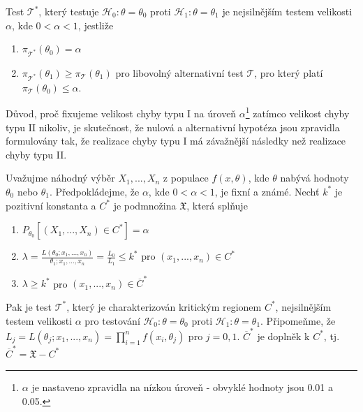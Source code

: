 \begin{definition}
Test $\mathscr{T}^*$, který testuje $\mathscr{H}_0: \theta = \theta_0$ proti $\mathscr{H}_1: \theta = \theta_1$ je nejsilnějším testem velikosti $\alpha$, kde $0 < \alpha < 1$, jestliže
\begin{enumerate}
\item $\pi_{\mathscr{T}^*}(\theta_0) = \alpha$
\item $\pi_{\mathscr{T}^*}(\theta_1) \ge \pi_{\mathscr{T}}(\theta_1)$ pro libovolný alternativní test $\mathscr{T}$, pro který platí $\pi_{\mathscr{T}}(\theta_0) \le \alpha$.
\end{enumerate}
\end{definition}

Důvod, proč fixujeme velikost chyby typu I na úroveň $\alpha$\footnote{$\alpha$ je nastaveno zpravidla na nízkou úroveň - obvyklé hodnoty jsou 0.01 a 0.05.} zatímco velikost chyby typu II nikoliv, je skutečnost, že nulová a alternativní hypotéza jsou zpravidla formulovány tak, že realizace chyby typu I má závažnější následky než realizace chyby typu II.

\begin{theorem}
Uvažujme náhodný výběr $X_1, ..., X_n$ z populace $f(x, \theta)$, kde $\theta$ nabývá hodnoty $\theta_0$ nebo $\theta_1$. Předpokládejme, že $\alpha$, kde $0 < \alpha < 1$, je fixní a známé. Nechť $k^*$ je pozitivní konstanta a $C^*$ je podmnožina $\mathfrak{X}$, která splňuje
\begin{enumerate}
\item $P_{\theta_0}[(X_1, ..., X_n) \in C^*] = \alpha$
\item $\lambda = \frac{L(\theta_0; x_1, ..., x_n)}{\theta_1; x_1, ..., x_n} = \frac{L_0}{L_1} \le k^*$ pro $(x_1, ..., x_n) \in C^*$
\item  $\lambda \ge k^*$ pro $(x_1, ..., x_n) \in \overline{C}^*$
\end{enumerate}
Pak je test $\mathscr{T}^*$, který je charakterizován kritickým regionem $C^*$, nejsilnějším testem velikosti $\alpha$ pro testování $\mathscr{H}_0: \theta = \theta_0$ proti $\mathscr{H}_1: \theta = \theta_1$. Připomeňme, že $L_j = L(\theta_j; x_1, ..., x_n) = \prod_{i = 1}^n f(x_i, \theta_j)$ pro $j = 0, 1$. $\overline{C}^*$ je doplněk k $C^*$, tj. $\overline{C}^* = \mathfrak{X} - C^*$
\end{theorem}

